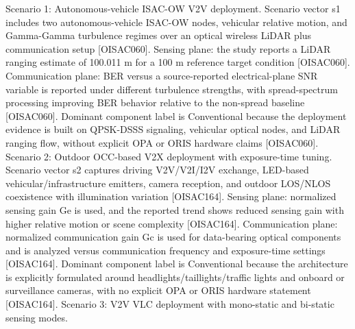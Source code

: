 {}
\markdownRendererSectionEnd \markdownRendererSectionBegin
{}\markdownRendererInterblockSeparator
{}Scenario 1: Autonomous-vehicle ISAC-OW V2V deployment.\markdownRendererHardLineBreak
{}Scenario vector s1 includes two autonomous-vehicle ISAC-OW nodes, vehicular relative motion, and Gamma-Gamma turbulence regimes over an optical wireless LiDAR plus communication setup [O\markdownRendererUnderscore{}ISAC\markdownRendererUnderscore{}060]. Sensing plane: the study reports a LiDAR ranging estimate of 100.011 m for a 100 m reference target condition [O\markdownRendererUnderscore{}ISAC\markdownRendererUnderscore{}060]. Communication plane: BER versus a source-reported electrical-plane SNR variable is reported under different turbulence strengths, with spread-spectrum processing improving BER behavior relative to the non-spread baseline [O\markdownRendererUnderscore{}ISAC\markdownRendererUnderscore{}060]. Dominant component label is Conventional because the deployment evidence is built on QPSK-DSSS signaling, vehicular optical nodes, and LiDAR ranging flow, without explicit OPA or ORIS hardware claims [O\markdownRendererUnderscore{}ISAC\markdownRendererUnderscore{}060].\markdownRendererParagraphSeparator
{}Scenario 2: Outdoor OCC-based V2X deployment with exposure-time tuning.\markdownRendererHardLineBreak
{}Scenario vector s2 captures driving V2V/V2I/I2V exchange, LED-based vehicular/infrastructure emitters, camera reception, and outdoor LOS/NLOS coexistence with illumination variation [O\markdownRendererUnderscore{}ISAC\markdownRendererUnderscore{}164]. Sensing plane: normalized sensing gain Ge is used, and the reported trend shows reduced sensing gain with higher relative motion or scene complexity [O\markdownRendererUnderscore{}ISAC\markdownRendererUnderscore{}164]. Communication plane: normalized communication gain Gc is used for data-bearing optical components and is analyzed versus communication frequency and exposure-time settings [O\markdownRendererUnderscore{}ISAC\markdownRendererUnderscore{}164]. Dominant component label is Conventional because the architecture is explicitly formulated around headlights/taillights/traffic lights and onboard or surveillance cameras, with no explicit OPA or ORIS hardware statement [O\markdownRendererUnderscore{}ISAC\markdownRendererUnderscore{}164].\markdownRendererParagraphSeparator
{}Scenario 3: V2V VLC deployment with mono-static and bi-static sensing modes.\markdownRendererHardLineBreak
